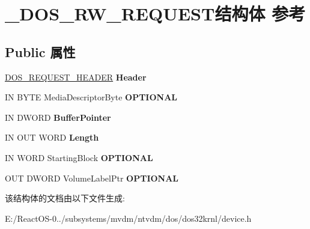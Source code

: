 \hypertarget{struct___d_o_s___r_w___r_e_q_u_e_s_t}{}\section{\+\_\+\+D\+O\+S\+\_\+\+R\+W\+\_\+\+R\+E\+Q\+U\+E\+S\+T结构体 参考}
\label{struct___d_o_s___r_w___r_e_q_u_e_s_t}
\subsection*{Public 属性}
\begin{DoxyCompactItemize}
\item 
\mbox{\label{struct___d_o_s___r_w___r_e_q_u_e_s_t_ade9e9054921fc99399b8d62dd16e62ae}} 
\hyperlink{struct___d_o_s___r_e_q_u_e_s_t___h_e_a_d_e_r}{D\+O\+S\+\_\+\+R\+E\+Q\+U\+E\+S\+T\+\_\+\+H\+E\+A\+D\+ER} {\bfseries Header}
\item 
\mbox{\label{struct___d_o_s___r_w___r_e_q_u_e_s_t_a28b36037ac7f8a8acc7d77c547780cb8}} 
IN B\+Y\+TE Media\+Descriptor\+Byte {\bfseries O\+P\+T\+I\+O\+N\+AL}
\item 
\mbox{\label{struct___d_o_s___r_w___r_e_q_u_e_s_t_a50525a5c15af3a05af6235d265b43df4}} 
IN D\+W\+O\+RD {\bfseries Buffer\+Pointer}
\item 
\mbox{\label{struct___d_o_s___r_w___r_e_q_u_e_s_t_af90dafac63dccf719355f9893d1d34c6}} 
IN O\+UT W\+O\+RD {\bfseries Length}
\item 
\mbox{\label{struct___d_o_s___r_w___r_e_q_u_e_s_t_a69d0330ad6d2eb1109c8f68f0da47947}} 
IN W\+O\+RD Starting\+Block {\bfseries O\+P\+T\+I\+O\+N\+AL}
\item 
\mbox{\label{struct___d_o_s___r_w___r_e_q_u_e_s_t_ab9855420a13960c70be4eccc5e41f8f1}} 
O\+UT D\+W\+O\+RD Volume\+Label\+Ptr {\bfseries O\+P\+T\+I\+O\+N\+AL}
\end{DoxyCompactItemize}


该结构体的文档由以下文件生成\+:\begin{DoxyCompactItemize}
\item 
E\+:/\+React\+O\+S-\/0../subsystems/mvdm/ntvdm/dos/dos32krnl/device.\+h\end{DoxyCompactItemize}
